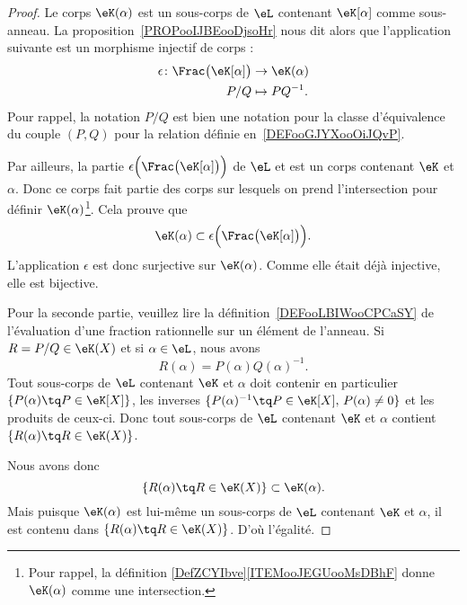 \begin{proof}
	Le corps \( \eK(\alpha)\) est un sous-corps de \( \eL\) contenant \( \eK[\alpha]\) comme sous-anneau. La proposition~\ref{PROPooIJBEooDjsoHr} nous dit alors que l'application suivante est un morphisme injectif de corps :
	\begin{equation}
		\begin{aligned}
			\epsilon\colon \Frac\big( \eK[\alpha] \big) & \to \eK(\alpha)  \\
			P/Q                                         & \mapsto PQ^{-1}.
		\end{aligned}
	\end{equation}
	Pour rappel, la notation \( P/Q\) est bien une notation pour la classe d'équivalence du couple \( (P,Q)\) pour la relation définie en~\ref{DEFooGJYXooOiJQvP}.

	Par ailleurs, la partie \( \epsilon\Big( \Frac\big( \eK[\alpha] \big) \Big) \) de \( \eL\) et est un corps contenant \( \eK\) et \( \alpha\). Donc ce corps fait partie des corps sur lesquels on prend l'intersection pour définir \( \eK(\alpha)\)\footnote{Pour rappel, la définition \ref{DefZCYIbve}\ref{ITEMooJEGUooMsDBhF} donne \( \eK(\alpha)\) comme une intersection.}. Cela prouve que
	\begin{equation}
		\eK(\alpha)\subset  \epsilon\Big( \Frac\big( \eK[\alpha] \big) \Big).
	\end{equation}
	L'application \( \epsilon\) est donc surjective sur \( \eK(\alpha)\). Comme elle était déjà injective, elle est bijective.

	Pour la seconde partie, veuillez lire la définition~\ref{DEFooLBIWooCPCaSY} de l'évaluation d'une fraction rationnelle sur un élément de l'anneau. Si \( R=P/Q\in \eK(X)\) et si \( \alpha\in \eL\), nous avons
	\begin{equation}
		R(\alpha)=P(\alpha)Q(\alpha)^{-1}.
	\end{equation}
	Tout sous-corps de \( \eL\) contenant \( \eK\) et \( \alpha\) doit contenir en particulier \( \{ P(\alpha)\tq P\in \eK[X] \} \), les inverses \( \{ P(\alpha)^{-1}\tq P\in \eK[X],\,P(\alpha)\neq 0 \}\) et les produits de ceux-ci. Donc tout sous-corps de \( \eL\) contenant \( \eK\) et \( \alpha\) contient \( \{ R(\alpha)\tq R\in \eK(X) \}\).

	Nous avons donc
	\begin{equation}
		\{ R(\alpha)\tq R\in \eK(X) \}\subset \eK(\alpha).
	\end{equation}
	Mais puisque \( \eK(\alpha)\) est lui-même un sous-corps de \( \eL\) contenant \( \eK\) et \( \alpha\), il est contenu dans \( \{ R(\alpha)\tq R\in \eK(X) \}\). D'où l'égalité.
\end{proof}

